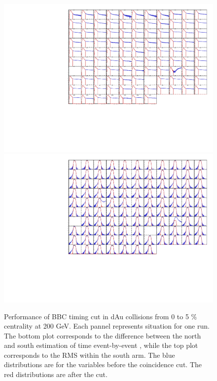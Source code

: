 \documentclass{article}
\begin{document}
\begin{figure}
\includegraphics[width=\textwidth]{fig_pileup/dAu200MB_TimingBBC_RMS}
\includegraphics[width=\textwidth]{fig_pileup/dAu200MB_TimingBBC_Time}
\label{fig.dau200mb.bbctimetime}
\caption{Performance of BBC timing cut  in dAu collisions from 0 to 5 \% centrality at 200 GeV. Each pannel represents situation for one run. The bottom plot corresponds to the difference between the north and south estimation of time event-by-event , while the top plot corresponds to the RMS within the south arm. The blue distributions are for the variables before the coincidence cut. The red distributions are after the cut.}
\end{figure}
\end{document}
